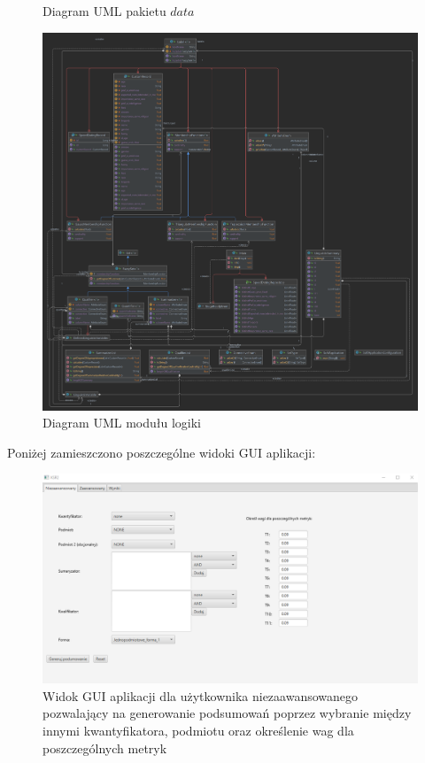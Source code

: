 \documentclass{classrep}
\begin{document}
\begin{enumerate}
\begin{figure}[H]
    \caption{Diagram UML pakietu \(data\)}
  \end{figure}
\end{enumerate}

  \begin{figure}[H]
    \includegraphics[scale = 0.1]{all}
    \caption{Diagram UML modułu logiki}
  \end{figure}

  Poniżej zamieszczono poszczególne widoki GUI aplikacji:
  
  \begin{figure}[H]
    \centering
    \includegraphics[scale = 0.5]{gui1}
    \caption{Widok GUI aplikacji dla użytkownika niezaawansowanego pozwalający na generowanie podsumowań poprzez wybranie między innymi kwantyfikatora, podmiotu oraz określenie wag dla poszczególnych metryk}
  \end{figure}
  
\end{document}
